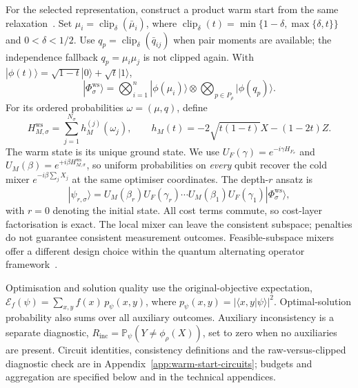 \documentclass[a4paper,onecolumn,11pt,unpublished]{quantumarticle}
\theoremstyle{remark}
\begin{document}
For the selected representation, construct a product warm start from the
same relaxation~\cite{Egger2021,TateSDP2023,TateCustom2023}.
Set $\mu_i=\operatorname{clip}_\delta(\bar\mu_i)$, where
$\operatorname{clip}_\delta(t)=\min\{1-\delta,\max\{\delta,t\}\}$ and
$0<\delta<1/2$. Use $q_p=\operatorname{clip}_\delta(\bar q_{ij})$ when
pair moments are available; the independence fallback $q_p=\mu_i\mu_j$
is not clipped again. With
$|\phi(t)\rangle=\sqrt{1-t}|0\rangle+\sqrt t|1\rangle$,
\begin{equation}
|\Phi_\sigma^{\mathrm{ws}}\rangle=
\bigotimes_{i=1}^n|\phi(\mu_i)\rangle
\otimes\bigotimes_{p\in P_\rho}|\phi(q_p)\rangle.
\label{eq:ws-state}
\end{equation}
For its ordered probabilities $\omega=(\mu,q)$, define
\begin{equation}
H_{M,\sigma}^{\mathrm{ws}}=\sum_{j=1}^{N_\sigma}h_M^{(j)}(\omega_j),
\qquad h_M(t)=-2\sqrt{t(1-t)}X-(1-2t)Z.
\label{eq:ws-mixer}
\end{equation}
The warm state is its unique ground state. We use
$U_F(\gamma)=e^{-i\gamma H_{F_\sigma}}$ and
$U_M(\beta)=e^{+i\beta H_{M,\sigma}^{\mathrm{ws}}}$, so uniform probabilities
on \emph{every} qubit recover the cold mixer
$e^{-i\beta\sum_jX_j}$ at the same optimiser coordinates. The depth-$r$ ansatz is
\begin{equation}
|\psi_{r,\sigma}\rangle=
U_M(\beta_r)U_F(\gamma_r)\cdots U_M(\beta_1)U_F(\gamma_1)
|\Phi_\sigma^{\mathrm{ws}}\rangle,
\label{eq:method-qaoa-ansatz}
\end{equation}
with $r=0$ denoting the initial state. All cost terms commute, so cost-layer
factorisation is exact. The local mixer can leave the consistent subspace;
penalties do not guarantee consistent measurement outcomes.
Feasible-subspace mixers offer a different design choice within the
quantum alternating operator framework~\cite{Hadfield2019}.

Optimisation and solution quality use the original-objective expectation,
$\mathcal E_f(\psi)=\sum_{x,y}f(x)\,p_\psi(x,y)$, where
$p_\psi(x,y)=|\langle x,y|\psi\rangle|^2$.
Optimal-solution probability also sums over all auxiliary outcomes.
Auxiliary inconsistency is a separate diagnostic,
$R_{\mathrm{inc}}=\mathbb P_\psi(Y\neq\phi_\rho(X))$, set to zero when no
auxiliaries are present. Circuit identities, consistency definitions and
the raw-versus-clipped diagnostic check are in
Appendix~\ref{app:warm-start-circuits}; budgets and aggregation are specified
below and in the technical appendices.
\end{document}
